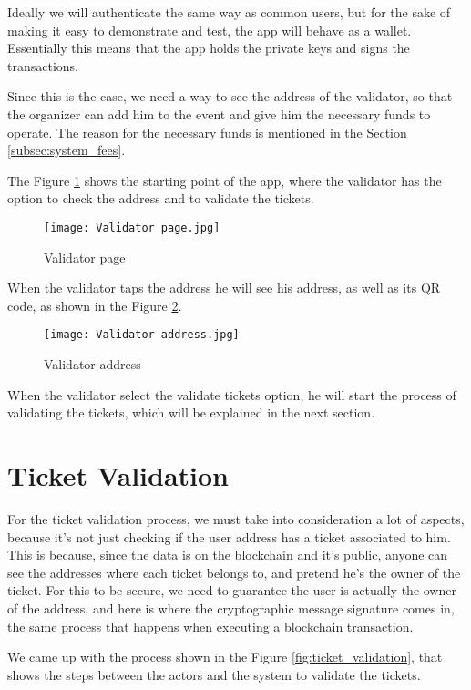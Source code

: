 Ideally we will authenticate the same way as common users, but for the sake of
making it easy to demonstrate and test, the app will behave as a wallet.
Essentially this means that the app holds the private keys and signs the
transactions.

Since this is the case, we need a way to see the address of the validator, so
that the organizer can add him to the event and give him the necessary funds to
operate. The reason for the necessary funds is mentioned in the Section
\ref{subsec:system_fees}.

The Figure \ref{fig:validator_page} shows the starting point of the app, where
the validator has the option to check the address and to validate the tickets.

\begin{figure}[H]
	\texttt{[image: Validator page.jpg]}
	\centering
	\caption{Validator page}
	\label{fig:validator_page}
\end{figure}

When the validator taps the address he will see his address, as well as its QR
code, as shown in the Figure \ref{fig:validator_address}.

\begin{figure}[H]
	\texttt{[image: Validator address.jpg]}
	\centering
	\caption{Validator address}
	\label{fig:validator_address}
\end{figure}

When the validator select the validate tickets option, he will start the
process of validating the tickets, which will be explained in the next section.

\section{Ticket Validation}
\label{sec:ticket_validation}

For the ticket validation process, we must take into consideration a lot of
aspects, because it's not just checking if the user address has a ticket
associated to him. This is because, since the data is on the blockchain and
it's public, anyone can see the addresses where each ticket belongs to, and
pretend he's the owner of the ticket. For this to be secure, we need to
guarantee the user is actually the owner of the address, and here is where the
cryptographic message signature comes in, the same process that happens when
executing a blockchain transaction.

We came up with the process shown in the Figure \ref{fig:ticket_validation},
that shows the steps between the actors and the system to validate the tickets.

